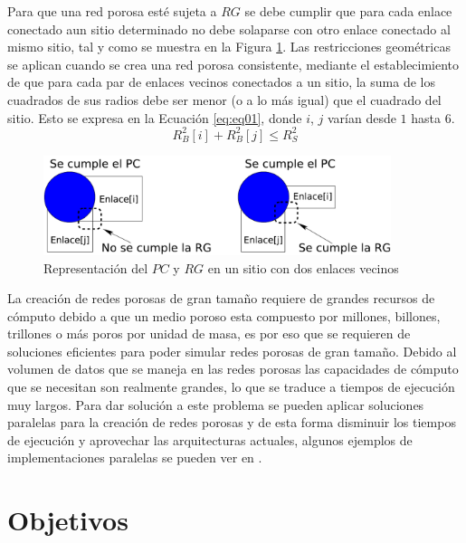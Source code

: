 Para que una red porosa esté sujeta a $RG$ se debe cumplir que para cada enlace conectado aun sitio determinado no debe solaparse con otro enlace conectado al mismo sitio, tal y como se muestra en la Figura \ref{fig:CPyGR}. Las restricciones geométricas se aplican cuando se crea una red porosa consistente, mediante el establecimiento de que para cada par de enlaces vecinos conectados a un sitio, la suma de los cuadrados de sus radios debe ser menor (o a lo más igual) que el cuadrado del sitio. Esto se expresa en la Ecuación \ref{eq:eq01}, donde $i$, $j$ varían desde $1$ hasta $6$.\\

\begin{equation}
R_{B}^2[i]+R_{B}^2[j] \leq R_{S}^2
\label{eq:eq01}
\end{equation}

\begin{figure}[hbtp]
\centering
\includegraphics[width=4.0in]{img/CPyGC_es.pdf}
\caption{Representación del $PC$ y $RG$ en un sitio con dos enlaces vecinos}
\label{fig:CPyGR}
\end{figure}

La creación de redes porosas de gran tamaño requiere de grandes recursos de cómputo debido a que un medio poroso esta compuesto por millones, billones, trillones o más poros por unidad de masa, es por eso que se requieren de soluciones eficientes  para poder simular redes porosas de gran tamaño. Debido al volumen de datos que se maneja en las redes porosas las capacidades de cómputo que se necesitan son realmente grandes, lo que se traduce a tiempos de ejecución muy largos. Para dar solución a este problema se pueden aplicar soluciones paralelas para la creación de redes porosas y de esta forma disminuir los tiempos de ejecución y aprovechar las arquitecturas actuales, algunos ejemplos de implementaciones paralelas se pueden ver en \cite{ref4}.\\

\chapter{Objetivos}
\label{champ:objetivos}
\bigskip
\barra
\bigskip



